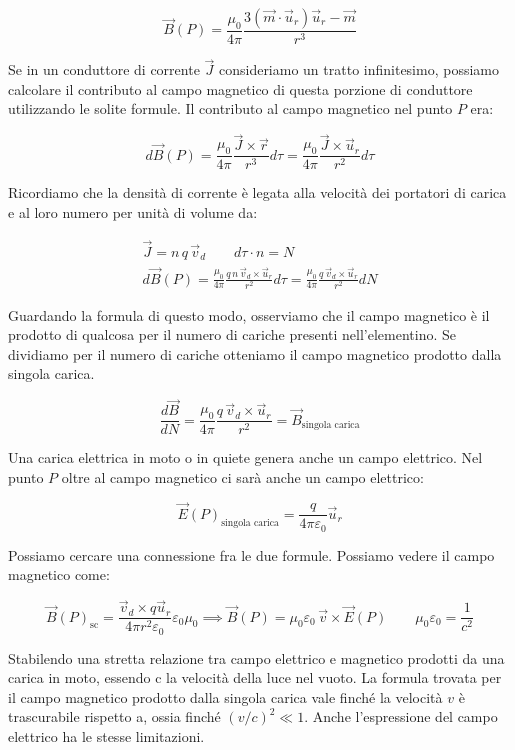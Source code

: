 \[
	\vec{B} (P)=\frac{\mu_0}{4\pi}\frac{3(\vec{m} \cdot \vec{u}_r)\vec{u}_r-\vec{m}}{r^3}
\]

Se in un conduttore di corrente $\vec{J}$ consideriamo un tratto infinitesimo, possiamo calcolare il contributo al campo magnetico di questa porzione di conduttore utilizzando le solite formule. Il contributo al campo magnetico nel punto $P$ era:

\[
	d\vec{B} (P)= \frac{\mu_0}{4\pi}\frac{\vec{J} \times \vec{r}}{r^3}d\tau =\frac{\mu_0}{4\pi}\frac{\vec{J} \times \vec{u}_r}{r^2}d\tau
\]

Ricordiamo che la densità di corrente è legata alla velocità dei portatori di carica e al loro numero per unità di volume da:

\begin{gather*}
	\vec{J} =n\,q\,\vec{v}_d \qquad d\tau \cdot n=N \\
	d\vec{B} (P)= \frac{\mu_0}{4\pi}\frac{q\,n\,\vec{v}_d\times \vec{u}_r}{r^2}d\tau = \frac{\mu_0}{4\pi}\frac{q\,\vec{v}_d\times \vec{u}_r}{r^2}dN
\end{gather*}

Guardando la formula di questo modo, osserviamo che il campo magnetico è il prodotto di qualcosa per il numero di cariche presenti nell'elementino. Se dividiamo per il numero di cariche otteniamo il campo magnetico prodotto dalla singola carica.

\[
	\frac{d\vec{B}}{dN}=\frac{\mu_0}{4\pi}\frac{q\,\vec{v}_d\times \vec{u}_r}{r^2} = \vec{B}_{\text{singola carica}}
\]

Una carica elettrica in moto o in quiete genera anche un campo elettrico. Nel punto $P$ oltre al campo magnetico ci sarà anche un campo elettrico:

\[
	\vec{E} (P)_{\text{singola carica}} = \frac{q}{4\pi \varepsilon_0} \vec{u}_r
\]

Possiamo cercare una connessione fra le due formule. Possiamo vedere il campo magnetico come:

\[
	\vec{B} (P)_{\text{sc}} = \frac{\vec{v}_d\times q\vec{u}_r}{4\pi r^2 \varepsilon_0} \varepsilon_0 \mu_0  \implies  \vec{B} (P) = \mu_0 \varepsilon_0 \,\vec{v} \times \vec{E} (P) \qquad \mu_0 \varepsilon_0 = \frac{1}{c^2}
\]

Stabilendo una stretta relazione tra campo elettrico e magnetico prodotti da una carica in moto, essendo c la velocità della luce nel vuoto. La formula trovata per il campo magnetico prodotto dalla singola carica vale finché la velocità $v$ è trascurabile rispetto a, ossia finché $ (v/c)^2 \ll 1 $. Anche l'espressione del campo elettrico ha le stesse limitazioni.

